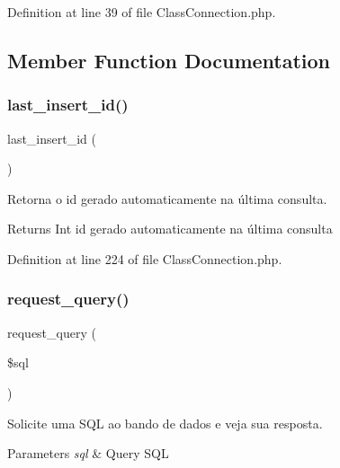 Definition at line 39 of file Class\+Connection.\+php.



\subsection{Member Function Documentation}
\mbox{\label{class_class_connection_addadc2022e9fe02f49da4f7672fb6819}} 
\subsubsection{\texorpdfstring{last\+\_\+insert\+\_\+id()}{last\_insert\_id()}}
{\footnotesize\ttfamily last\+\_\+insert\+\_\+id (\begin{DoxyParamCaption}{ }\end{DoxyParamCaption})}



Retorna o id gerado automaticamente na última consulta. 

\begin{DoxyReturn}{Returns}
Int id gerado automaticamente na última consulta 
\end{DoxyReturn}


Definition at line 224 of file Class\+Connection.\+php.

\mbox{\label{class_class_connection_a45aa0f36cd2827c49d8341cd34b43aa0}} 
\subsubsection{\texorpdfstring{request\+\_\+query()}{request\_query()}}
{\footnotesize\ttfamily request\+\_\+query (\begin{DoxyParamCaption}\item[{}]{\$sql }\end{DoxyParamCaption})}



Solicite uma S\+QL ao bando de dados e veja sua resposta. 


\begin{DoxyParams}{Parameters}
{\em sql} & Query S\+QL \\
\hline
\end{DoxyParams}


